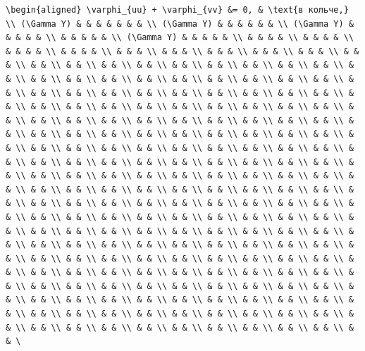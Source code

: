 \documentclass[
]{article}
\begin{document}
\begin{verbatim}
\begin{aligned} \varphi_{uu} + \varphi_{vv} &= 0, & \text{в кольче,} \\ (\Gamma Y) & & & & & & & \\ (\Gamma Y) & & & & & & \\ (\Gamma Y) & & & & & \\ & & & & & \\ (\Gamma Y) & & & & & \\ & & & & \\ & & & & \\ & & & & \\ & & & & \\ & & & \\ & & & \\ & & & \\ & & & \\ & & & \\ & & & \\ & & \\ & & \\ & & \\ & & \\ & & \\ & & \\ & & \\ & & \\ & & \\ & & \\ & & \\ & & \\ & & \\ & & \\ & & \\ & & \\ & & \\ & & \\ & & \\ & & \\ & & \\ & & \\ & & \\ & & \\ & & \\ & & \\ & & \\ & & \\ & & \\ & & \\ & & \\ & & \\ & & \\ & & \\ & & \\ & & \\ & & \\ & & \\ & & \\ & & \\ & & \\ & & \\ & & \\ & & \\ & & \\ & & \\ & & \\ & & \\ & & \\ & & \\ & & \\ & & \\ & & \\ & & \\ & & \\ & & \\ & & \\ & & \\ & & \\ & & \\ & & \\ & & \\ & & \\ & & \\ & & \\ & & \\ & & \\ & & \\ & & \\ & & \\ & & \\ & & \\ & & \\ & & \\ & & \\ & & \\ & & \\ & & \\ & & \\ & & \\ & & \\ & & \\ & & \\ & & \\ & & \\ & & \\ & & \\ & & \\ & & \\ & & \\ & & \\ & & \\ & & \\ & & \\ & & \\ & & \\ & & \\ & & \\ & & \\ & & \\ & & \\ & & \\ & & \\ & & \\ & & \\ & & \\ & & \\ & & \\ & & \\ & & \\ & & \\ & & \\ & & \\ & & \\ & & \\ & & \\ & & \\ & & \\ & & \\ & & \\ & & \\ & & \\ & & \\ & & \\ & & \\ & & \\ & & \\ & & \\ & & \\ & & \\ & & \\ & & \\ & & \\ & & \\ & & \\ & & \\ & & \\ & & \\ & & \\ & & \\ & & \\ & & \\ & & \\ & & \\ & & \\ & & \\ & & \\ & & \\ & & \\ & & \\ & & \\ & & \\ & & \\ & & \\ & & \\ & & \\ & & \\ & & \\ & & \\ & & \\ & & \\ & & \\ & & \\ & & \\ & & \\ & & \\ & & \\ & & \\ & & \\ & & \\ & & \\ & & \\ & & \\ & & \\ & & \\ & & \\ & & \\ & & \\ & & \\ & & \\ & & \\ & & \\ & & \\ & & \\ & & \\ & & \\ & & \\ & & \\ & & \\ & & \\ & & \\ & & \\ & & \\ & & \\ & & \\ & & \\ & & \\ & & \\ & & \\ & & \
\end{verbatim}
\end{document}
